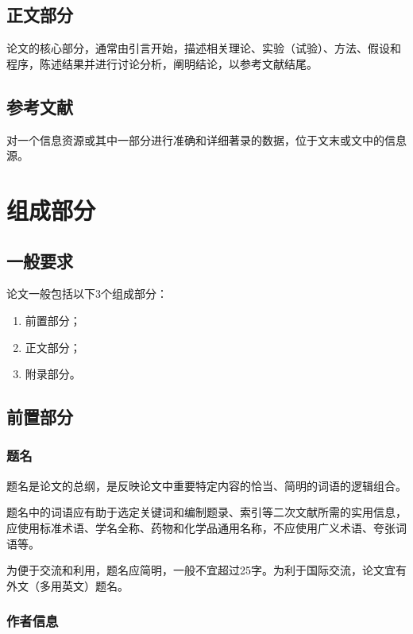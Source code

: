 \documentclass[a4paper,12pt]{ctexart}
\begin{document}
\subsection{正文部分}

论文的核心部分，通常由引言开始，描述相关理论、实验（试验）、方法、假设和程序，陈述结果并进行讨论分析，阐明结论，以参考文献结尾。

\subsection{参考文献}

对一个信息资源或其中一部分进行准确和详细著录的数据，位于文末或文中的信息源。

\section{组成部分}

\subsection{一般要求}

论文一般包括以下3个组成部分：
\begin{enumerate}[label=\alph*)]
\item 前置部分；
\item 正文部分；
\item 附录部分。
\end{enumerate}

\subsection{前置部分}

\subsubsection{题名}

题名是论文的总纲，是反映论文中重要特定内容的恰当、简明的词语的逻辑组合。

题名中的词语应有助于选定关键词和编制题录、索引等二次文献所需的实用信息，应使用标准术语、学名全称、药物和化学品通用名称，不应使用广义术语、夸张词语等。

为便于交流和利用，题名应简明，一般不宜超过25字。为利于国际交流，论文宜有外文（多用英文）题名。

\subsubsection{作者信息}
\end{document}
